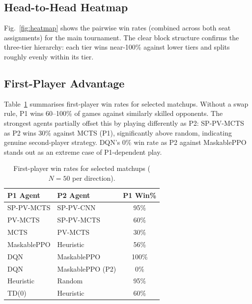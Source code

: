 \documentclass[conference]{IEEEtran}
\begin{document}
\subsection{Head-to-Head Heatmap}

Fig.~\ref{fig:heatmap} shows the pairwise win rates (combined across both seat
assignments) for the main tournament. The clear block structure confirms the
three-tier hierarchy: each tier wins near-100\% against lower tiers and splits
roughly evenly within its tier.

\subsection{First-Player Advantage}

Table~\ref{tab:p1advantage} summarises first-player win rates for selected
matchups. Without a swap rule, P1 wins 60--100\% of games against similarly
skilled opponents. The strongest agents partially offset this by playing
differently as P2: SP-PV-MCTS as P2 wins 30\% against MCTS (P1), significantly
above random, indicating genuine second-player strategy. DQN's 0\% win rate as
P2 against MaskablePPO stands out as an extreme case of P1-dependent play.

\begin{table}[h]
  \centering
  \caption{First-player win rates for selected matchups ($N=50$ per direction).}
  \label{tab:p1advantage}
  \renewcommand{\arraystretch}{1.15}
  \begin{tabular}{llc}
    \toprule
    \textbf{P1 Agent} & \textbf{P2 Agent} & \textbf{P1 Win\%} \\
    \midrule
    SP-PV-MCTS & SP-PV-CNN     & 95\%  \\
    PV-MCTS    & SP-PV-MCTS    & 60\%  \\
    MCTS       & PV-MCTS       & 30\%  \\
    MaskablePPO & Heuristic    & 56\%  \\
    DQN        & MaskablePPO   & 100\% \\
    DQN        & MaskablePPO (P2) & 0\%  \\
    Heuristic  & Random        & 95\%  \\
    TD(0)      & Heuristic     & 60\%  \\
    \bottomrule
  \end{tabular}
\end{table}

\end{document}
